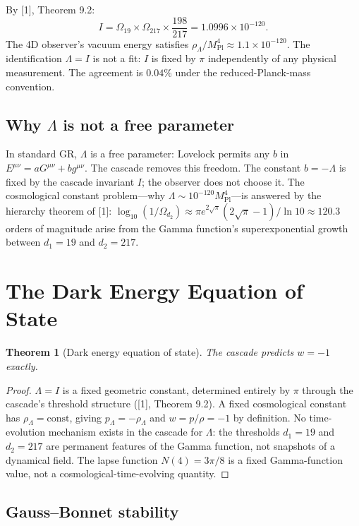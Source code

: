 \documentclass[12pt,a4paper]{article}
\newtheorem{theorem}{Theorem}[section]
\begin{document}
By [1], Theorem 9.2:
\[
I = \Omega_{19} \times \Omega_{217} \times \frac{198}{217} = 1.0996 \times 10^{-120}.
\]
The 4D observer's vacuum energy satisfies $\rho_\Lambda/M_{\text{Pl}}^4 \approx 1.1 \times 10^{-120}$. The identification $\Lambda = I$
is not a fit: $I$ is fixed by $\pi$ independently of any physical measurement. The agreement is
$0.04\%$ under the reduced-Planck-mass convention.

\subsection{Why $\Lambda$ is not a free parameter}

In standard GR, $\Lambda$ is a free parameter: Lovelock permits any $b$ in $E^{\mu\nu} = aG^{\mu\nu} + bg^{\mu\nu}$. The
cascade removes this freedom. The constant $b = -\Lambda$ is fixed by the cascade invariant $I$; the
observer does not choose it. The cosmological constant problem---why $\Lambda \sim 10^{-120}M_{\text{Pl}}^4$---is
answered by the hierarchy theorem of [1]: $\log_{10}(1/\Omega_{d_2}) \approx \pi e^{2\sqrt{\pi}}(2\sqrt{\pi} - 1)/\ln 10 \approx 120.3$
orders of magnitude arise from the Gamma function's superexponential growth between
$d_1 = 19$ and $d_2 = 217$.

\section{The Dark Energy Equation of State}

\begin{theorem}[Dark energy equation of state]
The cascade predicts $w = -1$ exactly.
\end{theorem}

\begin{proof}
$\Lambda = I$ is a fixed geometric constant, determined entirely by $\pi$ through the cascade's
threshold structure ([1], Theorem 9.2). A fixed cosmological constant has $\rho_\Lambda = \text{const}$,
giving $p_\Lambda = -\rho_\Lambda$ and $w = p/\rho = -1$ by definition. No time-evolution mechanism exists
in the cascade for $\Lambda$: the thresholds $d_1 = 19$ and $d_2 = 217$ are permanent features of the
Gamma function, not snapshots of a dynamical field. The lapse function $N(4) = 3\pi/8$ is a
fixed Gamma-function value, not a cosmological-time-evolving quantity.
\end{proof}

\subsection{Gauss--Bonnet stability}
\end{document}
